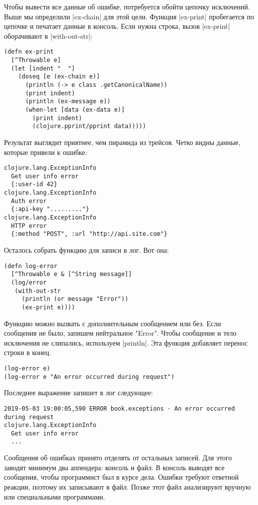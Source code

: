 Чтобы вывести все данные об ошибке, потребуется обойти цепочку исключений. Выше
мы определили \spverb|ex-chain| для этой цели. Функция \spverb|ex-print| пробегается по
цепочке и печатает данные в консоль. Если нужна строка, вызов \spverb|ex-print|
оборачивают в \spverb|with-out-str|:

\begin{verbatim}
(defn ex-print
  [^Throwable e]
  (let [indent "  "]
    (doseq [e (ex-chain e)]
      (println (-> e class .getCanonicalName))
      (print indent)
      (println (ex-message e))
      (when-let [data (ex-data e)]
        (print indent)
        (clojure.pprint/pprint data)))))
\end{verbatim}

Результат выглядит приятнее, чем пирамида из трейсов. Четко видны данные,
которые привели к ошибке:

\begin{verbatim}
clojure.lang.ExceptionInfo
  Get user info error
  {:user-id 42}
clojure.lang.ExceptionInfo
  Auth error
  {:api-key "........."}
clojure.lang.ExceptionInfo
  HTTP error
  {:method "POST", :url "http://api.site.com"}
\end{verbatim}

Осталось собрать функцию для записи в лог. Вот она:

\begin{verbatim}
(defn log-error
  [^Throwable e & [^String message]]
  (log/error
   (with-out-str
     (println (or message "Error"))
     (ex-print e))))
\end{verbatim}

Функцию можно вызвать с дополнительным сообщением или без. Если сообщения не
было, запишем нейтральное "Error". Чтобы сообщение и тело исключения не
слипались, используем \spverb|println|. Эта функция добавляет перенос строки в конец.

\begin{verbatim}
(log-error e)
(log-error e "An error occurred during request")
\end{verbatim}

Последнее выражение запишет в лог следующее:

\begin{verbatim}
2019-05-03 19:00:05,590 ERROR book.exceptions - An error occurred during request
clojure.lang.ExceptionInfo
  Get user info error
  ...
\end{verbatim}

Сообщения об ошибках принято отделять от остальных записей. Для этого заводят
минимум два аппендера: консоль и файл. В консоль выводят все сообщения, чтобы
программист был в курсе дела. Ошибки требуют ответной реакции, поэтому их
записывают в файл. Позже этот файл анализируют вручную или специальными
программами.


